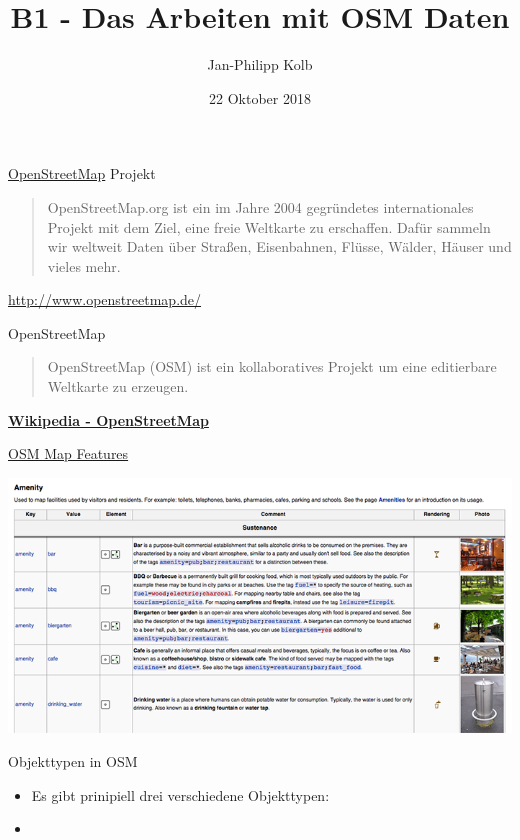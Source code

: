 \documentclass[ignorenonframetext,]{beamer}
\title{B1 - Das Arbeiten mit OSM Daten}
\author{Jan-Philipp Kolb}
\date{22 Oktober 2018}
\begin{document}
\frame{\titlepage}

\begin{frame}{\href{http://www.openstreetmap.de/}{OpenStreetMap}
Projekt}
\protect\hypertarget{openstreetmap-projekt}{}

\begin{quote}
OpenStreetMap.org ist ein im Jahre 2004 gegründetes internationales
Projekt mit dem Ziel, eine freie Weltkarte zu erschaffen. Dafür sammeln
wir weltweit Daten über Straßen, Eisenbahnen, Flüsse, Wälder, Häuser und
vieles mehr.
\end{quote}

\url{http://www.openstreetmap.de/}

\end{frame}

\begin{frame}{OpenStreetMap}
\protect\hypertarget{openstreetmap}{}

\begin{quote}
OpenStreetMap (OSM) ist ein kollaboratives Projekt um eine editierbare
Weltkarte zu erzeugen.
\end{quote}

\href{https://en.wikipedia.org/wiki/OpenStreetMap}{\textbf{Wikipedia -
OpenStreetMap}}

\end{frame}

\begin{frame}{\href{http://wiki.openstreetmap.org/wiki/DE:Map_Features}{OSM
Map Features}}
\protect\hypertarget{osm-map-features}{}

\includegraphics{figure/osm_mapfeatures.png}

\end{frame}

\begin{frame}{Objekttypen in OSM}
\protect\hypertarget{objekttypen-in-osm}{}

\begin{itemize}
\item
  Es gibt prinipiell drei verschiedene Objekttypen:
\item
\end{itemize}

\end{frame}
\end{document}
